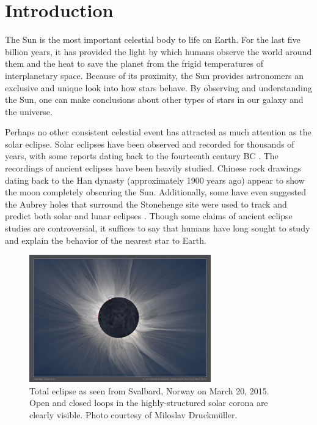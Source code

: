 \chapter{Introduction}
\label{ch:intro}
\par The Sun is the most important celestial body to life on Earth. For the last five billion years, it has provided the light by which humans observe the world around them and the heat to save the planet from the frigid temperatures of interplanetary space. Because of its proximity, the Sun provides astronomers an exclusive and unique look into how stars behave. By observing and understanding the Sun, one can make conclusions about other types of stars in our galaxy and the universe.
%
\par Perhaps no other consistent celestial event has attracted as much attention as the solar eclipse. Solar eclipses have been observed and recorded for thousands of years, with some reports dating back to the fourteenth century BC \citep{golub_solar_2010}. The recordings of ancient eclipses have been heavily studied. Chinese rock drawings dating back to the Han dynasty (approximately 1900 years ago) appear to show the moon completely obscuring the Sun. Additionally, some have even suggested the Aubrey holes that surround the Stonehenge site were used to track and predict both solar and lunar eclipses \citep{golub_solar_2010}. Though some claims of ancient eclipse studies are controversial, it suffices to say that humans have long sought to study and explain the behavior of the nearest star to Earth.
%
\begin{figure}[htbp]
	\centering
	\includegraphics[width=0.7\textwidth]{figures/Tse_2015_Svalbard_800mm_Nikon_D810.png}
	\caption{Total eclipse as seen from Svalbard, Norway on March 20, 2015. Open and closed loops in the highly-structured solar corona are clearly visible. Photo courtesy of Miloslav Druckm\"{u}ller.}
	\label{fig:solar_eclipse}
\end{figure}
